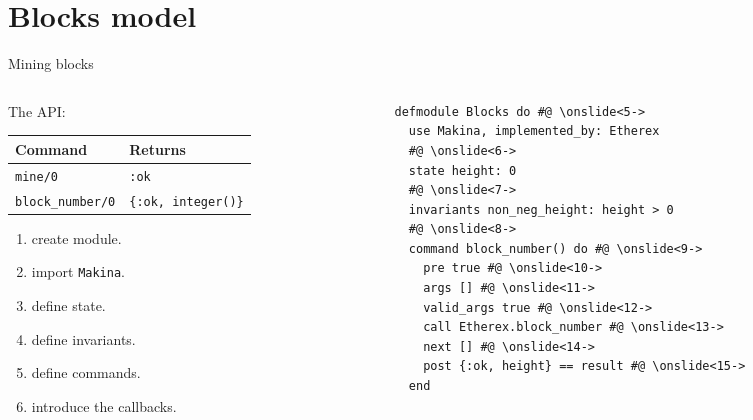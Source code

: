 \documentclass[aspectratio=169, 10pt]{beamer}
\begin{document}
\section{Blocks model}
\label{sec:org0451f93}
\begin{frame}[label={sec:org4841276},fragile]{Mining blocks}
 \begin{columns}
\begin{column}{0.48\columnwidth}
\onslide<+->
\onslide<+->
The API:
\onslide<+->
\begin{center}
\begin{tabular}{ll}
Command & Returns\\
\hline
\texttt{mine/0} & \texttt{:ok}\\
\texttt{block\_number/0} & \texttt{\{:ok, integer()\}}\\
\end{tabular}
\end{center}
\onslide<+->
\vspace{10pt}
\begin{enumerate}
\item create module.
\onslide<+->
\item import \texttt{Makina}.
\onslide<+->
\item define state.
\onslide<+->
\item define invariants.
\onslide<+->
\item define commands.
\onslide<+->
\item introduce the callbacks.
\end{enumerate}
\end{column}

\begin{column}{0.48\columnwidth}
\lstset{language=elixir,label= ,caption= ,captionpos=b,numbers=none,style=display}
\begin{lstlisting}
defmodule Blocks do #@ \onslide<5->
  use Makina, implemented_by: Etherex
  #@ \onslide<6->
  state height: 0
  #@ \onslide<7->
  invariants non_neg_height: height > 0
  #@ \onslide<8->
  command block_number() do #@ \onslide<9->
    pre true #@ \onslide<10->
    args [] #@ \onslide<11->
    valid_args true #@ \onslide<12->
    call Etherex.block_number #@ \onslide<13->
    next [] #@ \onslide<14->
    post {:ok, height} == result #@ \onslide<15->
  end
\end{lstlisting}
\end{column}
\end{columns}
\end{frame}
\end{document}
